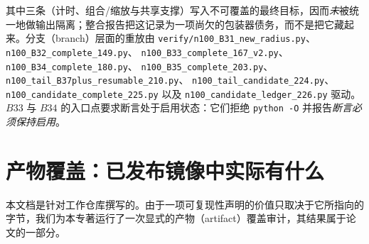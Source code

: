 其中三条（计时、组合/缩放与共享支撑）写入不可覆盖的最终目标，因而\emph{未}被统一地做输出隔离；整合报告把这记录为一项尚欠的包装器债务，而不是把它藏起来。分支（branch）层面的重放由
\texttt{verify/\allowbreak{}n100\_\allowbreak{}B31\_\allowbreak{}new\_\allowbreak{}radius.py}、\texttt{n100\_\allowbreak{}B32\_\allowbreak{}complete\_\allowbreak{}149.py}、
\texttt{n100\_\allowbreak{}B33\_\allowbreak{}complete\_\allowbreak{}167\_\allowbreak{}v2.py}、\texttt{n100\_\allowbreak{}B34\_\allowbreak{}complete\_\allowbreak{}180.py}、
\texttt{n100\_\allowbreak{}B35\_\allowbreak{}complete\_\allowbreak{}203.py}、\texttt{n100\_\allowbreak{}tail\_\allowbreak{}B37plus\_\allowbreak{}resumable\_\allowbreak{}210.py}、
\texttt{n100\_\allowbreak{}tail\_\allowbreak{}candidate\_\allowbreak{}224.py}、\texttt{n100\_\allowbreak{}candidate\_\allowbreak{}complete\_\allowbreak{}225.py} 以及
\texttt{n100\_\allowbreak{}candidate\_\allowbreak{}ledger\_\allowbreak{}226.py} 驱动。$B33$ 与 $B34$ 的入口点要求断言处于启用状态：它们拒绝 \texttt{python -\allowbreak{}O} 并报告\emph{断言必须保持启用}。

\section{产物覆盖：已发布镜像中实际有什么}

本文档是针对工作仓库撰写的。由于一项可复现性声明的价值只取决于它所指向的字节，我们为本专著运行了一次显式的产物（artifact）覆盖审计，其结果属于论文的一部分。


